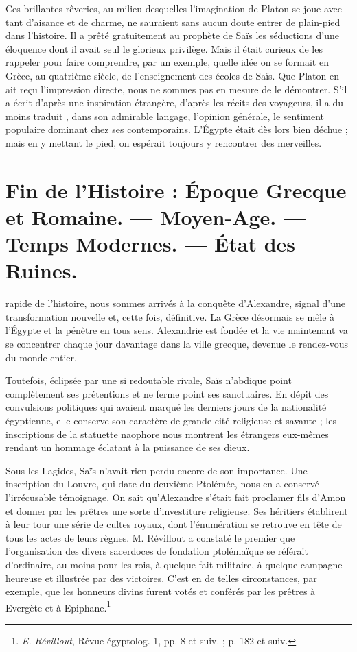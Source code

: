 \documentclass[letterpaper,twocolumn,openany,nodeprecatedcode]{dndbook}
\begin{document}
Ces brillantes rêveries, au milieu desquelles l'imagination de Platon se joue avec tant d'aisance et de charme, ne sauraient sans aucun doute entrer de plain-pied dans l'histoire. Il a prêté gratuitement au prophète de Saïs les séductions d'une éloquence dont il avait seul le glorieux privilège. Mais il était curieux de les rappeler pour faire comprendre, par un exemple, quelle idée on se formait en Grèce, au quatrième siècle, de l'enseignement des écoles de Saïs. Que Platon en ait reçu l'impression directe, nous ne sommes pas en mesure de le démontrer. S'il a écrit d'après une inspiration étrangère, d'après les récits des voyageurs, il a du moins traduit , dans son admirable langage, l'opinion générale, le sentiment populaire dominant chez ses contemporains. L'Égypte était dès lors bien déchue ; mais en y mettant le pied, on espérait toujours y rencontrer des merveilles.
\clearpage
\chapter{Fin de l'Histoire : Époque Grecque et Romaine. --- Moyen-Age. --- Temps Modernes. --- État des Ruines.}
 rapide de l'histoire, nous sommes arrivés à la conquête d'Alexandre, signal d'une transformation nouvelle et, cette fois, définitive. La Grèce désormais se mêle à l'Égypte et la pénètre en tous sens. Alexandrie est fondée et la vie maintenant va se concentrer chaque jour davantage dans la ville grecque, devenue le rendez-vous du monde entier.

Toutefois, éclipsée par une si redoutable rivale, Saïs n'abdique point complètement ses prétentions et ne ferme point ses sanctuaires. En dépit des convulsions politiques qui avaient marqué les derniers jours de la nationalité égyptienne, elle conserve son caractère de grande cité religieuse et savante ; les inscriptions de la statuette naophore nous montrent les étrangers eux-mêmes rendant un hommage éclatant à la puissance de ses dieux.

Sous les Lagides, Saïs n'avait rien perdu encore de son importance. Une inscription du Louvre, qui date du deuxième Ptolémée, nous en a conservé l'irrécusable témoignage. On sait qu'Alexandre s'était fait proclamer fils d'Amon et donner par les prêtres une sorte d'investiture religieuse. Ses héritiers établirent à leur tour une série de cultes royaux, dont l'énumération se retrouve en tête de tous les actes de leurs règnes. M. Révillout a constaté le premier que l'organisation des divers sacerdoces de fondation ptolémaïque se référait d'ordinaire, au moins pour les rois, à quelque fait militaire, à quelque campagne heureuse et illustrée par des victoires. C'est en de telles circonstances, par exemple, que les honneurs divins furent votés et conférés par les prêtres à Evergète et à Epiphane.\footnote{\emph{E. Révillout}, Révue égyptolog. 1, pp. 8 et suiv. ; p. 182 et suiv.}
\end{document}

